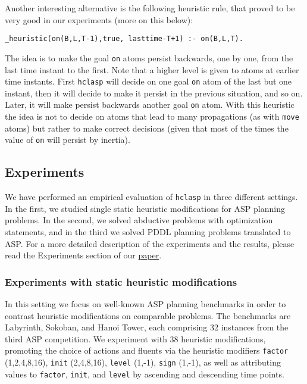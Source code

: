  Another interesting alternative is the following heuristic rule,  that proved to be very good in our experiments (more on this below): 
\begin{verbatim}
_heuristic(on(B,L,T-1),true, lasttime-T+1) :- on(B,L,T).\end{verbatim}

 The idea is to make the goal \texttt{on} atoms persist backwards, one by one, from the last time instant to the first. Note that a higher level is given to atoms at earlier time instants. First \texttt{hclasp} will decide on one goal \texttt{on} atom of the last but one instant,  then it will decide to make it persist in the previous situation, and so on.  Later, it will make persist backwards another goal \texttt{on} atom. With this heuristic the idea is not to decide on atoms that lead to many propagations (as with \texttt{move} atoms) but rather to make correct decisions (given that most of the times the value of \texttt{on} will persist by inertia). 


\subsection{Experiments}

 We have performed an empirical evaluation of \texttt{hclasp} in three different settings. In the first, we studied single static heuristic modifications for ASP planning problems.  In the second, we solved abductive problems with optimization statements,   and in the third we solved PDDL planning problems translated to ASP.   For a more detailed description of the experiments and the results,  please read the Experiments section of our \href{http://www.cs.uni-potsdam.de/wv/pdfformat/gekaotroscwa13a.pdf}{paper}.  

\subsubsection{Experiments with static heuristic modifications}

 In this setting we focus on well-known ASP planning benchmarks in order to contrast heuristic modifications on comparable problems. The benchmarks are Labyrinth, Sokoban, and Hanoi Tower, each comprising 32 instances from the third ASP competition. We experiment with 38 heuristic modifications, promoting the choice of actions and fluents via the heuristic modifiers  \texttt{factor} (1,2,4,8,16),  \texttt{init} (2,4,8,16), \texttt{level} (1,-1),  \texttt{sign} (1,-1),  as well as attributing values to \texttt{factor}, \texttt{init}, and \texttt{level}  by ascending and descending time points. 

